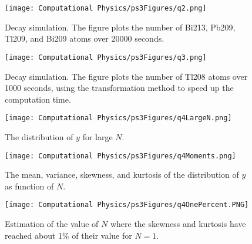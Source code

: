 \documentclass[11pt]{article}
\begin{document}
\begin{figure}[b!]
\centering
\texttt{[image: Computational Physics/ps3Figures/q2.png]}
\caption{Decay simulation. The figure plots the number of Bi213, Pb209, Tl209, and Bi209 atoms over 20000 seconds.}
  \label{fig:Q2}
\end{figure}

\begin{figure}[b!]
\centering
\texttt{[image: Computational Physics/ps3Figures/q3.png]}
\caption{Decay simulation. The figure plots the number of Tl208 atoms over 1000 seconds, using the transformation method to speed up the computation time.}
  \label{fig:Q3}
\end{figure}

\begin{figure}[b!]
\centering
\texttt{[image: Computational Physics/ps3Figures/q4LargeN.png]}
\caption{The distribution of $y$ for large $N$.}
  \label{fig:Q4LargeN}
\end{figure}

\begin{figure}[b!]
\centering
\texttt{[image: Computational Physics/ps3Figures/q4Moments.png]}
\caption{The mean, variance, skewness, and kurtosis of the distribution of $y$ as function of $N$.}
  \label{fig:Q4Moments}
\end{figure}

\begin{figure}[b!]
\centering
\texttt{[image: Computational Physics/ps3Figures/q4OnePercent.PNG]}
\caption{Estimation of the value of $N$ where the skewness and kurtosis have reached about 1\% of their value for $N=1$.}
  \label{fig:Q4OnePercent}
\end{figure}



\end{document}
